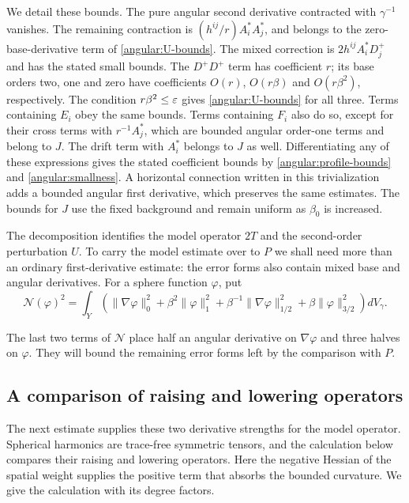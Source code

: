 We detail these bounds.  The pure angular second derivative contracted
with $\gamma^{-1}$ vanishes.  The remaining contraction is
$(h^{ij}/r)A_i^*A_j^*$, and belongs to the zero-base-derivative term of
\eqref{angular:U-bounds}.  The mixed correction is
$2h^{ij}A_i^*D_j^+$ and has the stated small bounds.  The $D^+D^+$ term
has coefficient $r$; its base orders two, one and zero have coefficients
$O(r)$, $O(r\beta)$ and $O(r\beta^2)$, respectively.  The condition
$r\beta^2\le\varepsilon$ gives \eqref{angular:U-bounds} for all three.
Terms containing $E_i$ obey the same bounds.  Terms containing $F_i$
also do so, except for their cross terms with $r^{-1}A_j^*$, which are
bounded angular order-one terms and belong to $J$.  The drift term with
$A_i^*$ belongs to $J$ as well.  Differentiating any of these expressions
gives the stated coefficient bounds by
\eqref{angular:profile-bounds} and \eqref{angular:smallness}.
A horizontal connection written in this trivialization adds a bounded
angular first derivative, which preserves the same estimates.  The bounds
for $J$ use the fixed background and remain uniform as $\beta_0$ is
increased.

The decomposition identifies the model operator $2T$ and the
second-order perturbation $U$.  To carry the model estimate over to $P$
we shall need more than an ordinary first-derivative estimate: the error forms
also contain mixed base and angular derivatives.  For a sphere function
$\varphi$, put
\begin{equation}\label{angular:N-definition}
 \mathcal N(\varphi)^2
 =\int_Y\left(
  \|\nabla\varphi\|_0^2+\beta^2\|\varphi\|_1^2
  +\beta^{-1}\|\nabla\varphi\|_{1/2}^2
  +\beta\|\varphi\|_{3/2}^2\right)dV_\gamma.
\end{equation}

The last two terms of $\mathcal N$ place half an angular derivative
on $\nabla\varphi$ and three halves on $\varphi$.  They will bound the
remaining error forms left by the comparison with $P$.

\subsection{A comparison of raising and lowering operators}

The next estimate supplies these two derivative strengths for the model
operator.  Spherical harmonics are trace-free symmetric tensors, and
the calculation below compares their raising and lowering operators.
Here the negative Hessian of the spatial weight supplies the positive
term that absorbs the bounded curvature.  We give the calculation with
its degree factors.

